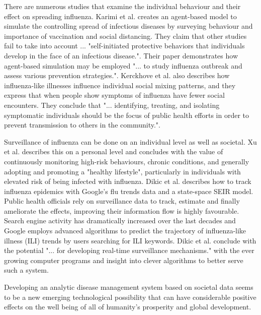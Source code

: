 There are numerous studies that examine the individual behaviour and their effect on spreading influenza. Karimi et al.\cite{karimi2015effect} creates an agent-based model to simulate the controlling spread of infectious diseases by surveying behaviour and importance of vaccination and social distancing. They claim that other studies fail to take into account ... "self-initiated protective behaviors that individuals develop in the face of an infectious disease.". Their paper demonstrates how agent-based simulation may be employed "... to study influenza outbreak and assess various prevention strategies.". Kerckhove et al.\cite{van2013impact} also describes how influenza-like illnesses influence individual social mixing patterns, and they express that when people show symptoms of influenza have fewer social encounters. 
They conclude that "... identifying, treating, and isolating symptomatic individuals should be the focus of public health efforts in order to prevent transmission to others in the community.".

Surveillance of influenza can be done on an individual level as well as societal. Xu et al.\cite{xu2014surveillance} describes this on a personal level and concludes with the value of continuously monitoring high-risk behaviours, chronic conditions, and generally adopting and promoting a "healthy lifestyle", particularly in individuals with elevated risk of being infected with influenza. Dikic et al.\cite{dukic2012tracking} describes how to track influenza epidemics with Google's flu trends\cite{google_flu_trends} data and a state-space SEIR model. Public health officials rely on surveillance data to track, estimate and finally ameliorate the effects, improving their information flow is highly favourable. Search engine activity has dramatically increased over the last decades and Google employs advanced algorithms to predict the trajectory of influenza-like illness (ILI) trends by users searching for ILI keywords. Dikic et al. conclude with the potential "... for developing real-time surveillance mechanisms." with the ever growing computer programs and insight into clever algorithms to better serve such a system.

Developing an analytic disease management system based on societal data seems to be a new emerging technological possibility that can have considerable positive effects on the well being of all of humanity's prosperity and global development.






